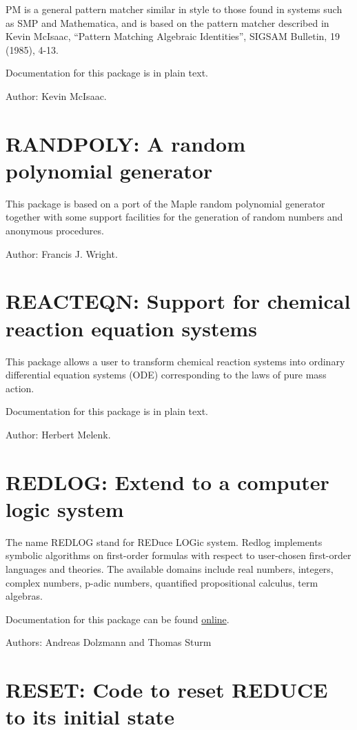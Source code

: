 PM is a general pattern matcher similar in style to those found in systems
such as SMP and Mathematica, and is based on the pattern matcher described
in Kevin McIsaac, ``Pattern Matching Algebraic Identities'', SIGSAM Bulletin,
19 (1985), 4-13.

Documentation for this package is in plain text.

Author: Kevin McIsaac.

\section{RANDPOLY: A random polynomial generator} 

This package is based on a port of the Maple random polynomial
generator together with some support facilities for the generation
of random numbers and anonymous procedures.

Author: Francis J. Wright.

\section{REACTEQN: Support for chemical reaction equation systems}

This package allows a user to transform chemical reaction systems into
ordinary differential equation systems (ODE) corresponding to the laws of
pure mass action.

Documentation for this package is in plain text.

Author: Herbert Melenk.




\section{REDLOG: Extend \REDUCE{} to a computer logic system}

The name REDLOG stand for REDuce LOGic system. Redlog implements
symbolic algorithms on first-order formulas with respect to
user-chosen first-order languages and theories. The available domains
include real numbers, integers, complex numbers, p-adic numbers,
quantified propositional calculus, term algebras.

Documentation for this package can be found \href{http://redlog.eu/}{online}.

Authors: Andreas Dolzmann and Thomas Sturm

\section{RESET: Code to reset REDUCE to its initial state} 

